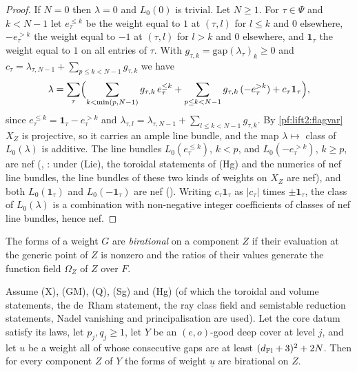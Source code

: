\begin{proof}
If $N=0$ then $\lambda=0$ and $L_0(0)$ is trivial. Let $N\ge1$. For $\tau\in\Psi$ and $k<N-1$ let $e^{\le k}_\tau$ be the
weight equal to $1$ at $(\tau,l)$ for $l\le k$ and $0$ elsewhere, $-e^{>k}_\tau$ the weight equal to $-1$ at $(\tau,l)$ for
$l>k$ and $0$ elsewhere, and $\mathbf1_\tau$ the weight equal to $1$ on all entries of $\tau$. With
$g_{\tau,k}=\mathrm{gap}(\lambda_\tau)_k\ge0$ and $c_\tau=\lambda_{\tau,N-1}+\sum_{p\le k<N-1}g_{\tau,k}$ we have
\[
\lambda=\sum_{\tau}\Bigl(\sum_{k<\min(p,N-1)}g_{\tau,k}\,e^{\le k}_\tau+\sum_{p\le k<N-1}g_{\tau,k}\,(-e^{>k}_\tau)
+c_\tau\mathbf1_\tau\Bigr),
\]
since $e^{\le k}_\tau=\mathbf1_\tau-e^{>k}_\tau$ and $\lambda_{\tau,l}=\lambda_{\tau,N-1}+\sum_{l\le k<N-1}g_{\tau,k}$. By
\cref{pf:lift2:flagvar} $X_Z$ is projective, so it carries an ample line bundle, and the map $\lambda\mapsto$ class of
$L_0(\lambda)$ is additive. The line bundles $L_0(e^{\le k}_\tau)$, $k<p$, and $L_0(-e^{>k}_\tau)$, $k\ge p$, are nef
(, : under
\textup{(Lie)}, the toroidal statements of \textup{(Hg)} and the numerics of nef line bundles, the line bundles of these
two kinds of weights on $X_Z$ are nef), and both $L_0(\mathbf1_\tau)$ and $L_0(-\mathbf1_\tau)$ are nef
(). Writing $c_\tau\mathbf1_\tau$ as $|c_\tau|$ times $\pm\mathbf1_\tau$, the
class of $L_0(\lambda)$ is a combination with non-negative integer coefficients of classes of nef line bundles, hence nef.
\end{proof}

\begin{definition}[Birationality]\label{pf:lift2:def:biron}
The forms of a weight $G$ are \emph{birational} on a component $Z$ if their evaluation at the generic point of $Z$ is
nonzero and the ratios of their values generate the function field $\Omega_Z$ of $Z$ over $F$.
\end{definition}

\begin{proposition}\label{pf:lift2:biron}
Assume \textup{(X)}, \textup{(GM)}, \textup{(Q)}, \textup{(Sg)} and \textup{(Hg)} (of which the toroidal and volume
statements, the de~Rham statement, the ray class field and semistable reduction statements, Nadel vanishing and
principalisation are used). Let the core datum satisfy its laws, let $p_j,q_j\ge1$, let $Y$ be an $(e,o)$-good deep cover
at level $j$, and let $u$ be a weight all of whose consecutive gaps are at least $(d_{\mathrm{Fl}}+3)^2+2N$. Then for every
component $Z$ of $Y$ the forms of weight $\underline u$ are birational on $Z$.
\end{proposition}

